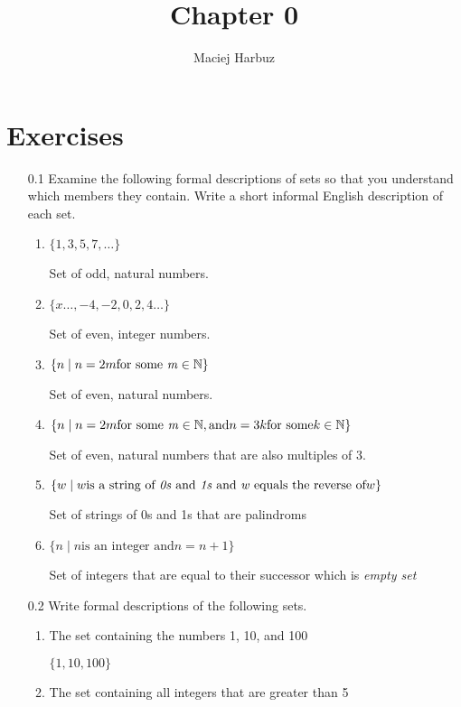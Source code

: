 \documentclass[12pt, a4paper]{article}
\title{Chapter 0}
\author{Maciej Harbuz}
\begin{document}
\maketitle

\section{Exercises}

\begin{enumerate}

    \item[0.1]
Examine the following formal descriptions of sets so that you understand which members they contain. Write a short informal English description of each set.
\begin{enumerate}

\item 
$\{1, 3, 5, 7, \ldots \}$

Set of odd, natural numbers.
\item 
$\{x \ldots, -4, -2, 0, 2, 4 \ldots \}$

Set of even, integer numbers.
\item 
$\{n \mid n = 2m \text{for some \textit{m}} \in \mathbb{N} \}$

Set of even, natural numbers.
\item 
$\{n \mid n = 2m \text{for some \textit{m}} \in \mathbb{N}, \text{and} n = 3k \text{for some} k \in \mathbb{N} \}$

Set of even, natural numbers that are also multiples of 3.
\item 
$\{w \mid w  \text{is a string of \textit{0s} and \textit{1s} and \textit{w} equals the reverse of} w\}$

Set of strings of 0s and 1s that are palindroms 
\item $\{ n \mid n \text{is an integer and}  n = n+1\}$

Set of integers that are equal to their successor which is \textit{empty set}
\end{enumerate}

    \item[0.2]
Write  formal descriptions  of the following sets.

\begin{enumerate}
\item The set containing the numbers 1, 10, and 100

    $\{1, 10, 100\}$
\item The set containing all integers that are greater than 5
    

\end{enumerate}
\end{enumerate}
\end{document}
